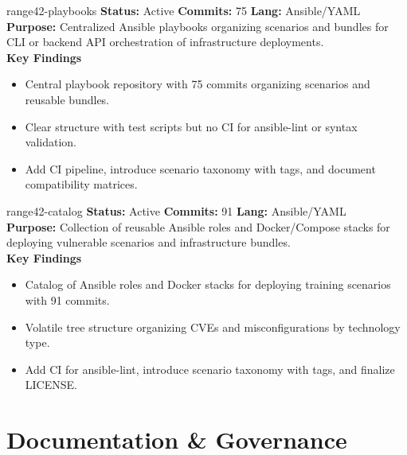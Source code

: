 \documentclass[aspectratio=169]{beamer}
\begin{document}
\begin{frame}{range42-playbooks \; \faCubes}
  \textbf{Status:} Active \hfill \textbf{Commits:} 75 \hfill \textbf{Lang:} Ansible/YAML\\[2mm]
  \textbf{Purpose:} Centralized Ansible playbooks organizing scenarios and bundles for CLI or backend API orchestration of infrastructure deployments.\\[2mm]
  \textbf{Key Findings}
  \begin{itemize}
    \item Central playbook repository with 75 commits organizing scenarios and reusable bundles.
    \item Clear structure with test scripts but no CI for ansible-lint or syntax validation.
    \item Add CI pipeline, introduce scenario taxonomy with tags, and document compatibility matrices.
  \end{itemize}
\end{frame}

\begin{frame}{range42-catalog \; \faBoxes}
  \textbf{Status:} Active \hfill \textbf{Commits:} 91 \hfill \textbf{Lang:} Ansible/YAML\\[2mm]
  \textbf{Purpose:} Collection of reusable Ansible roles and Docker/Compose stacks for deploying vulnerable scenarios and infrastructure bundles.\\[2mm]
  \textbf{Key Findings}
  \begin{itemize}
    \item Catalog of Ansible roles and Docker stacks for deploying training scenarios with 91 commits.
    \item Volatile tree structure organizing CVEs and misconfigurations by technology type.
    \item Add CI for ansible-lint, introduce scenario taxonomy with tags, and finalize LICENSE.
  \end{itemize}
\end{frame}

\section{Documentation \& Governance}
\end{document}
